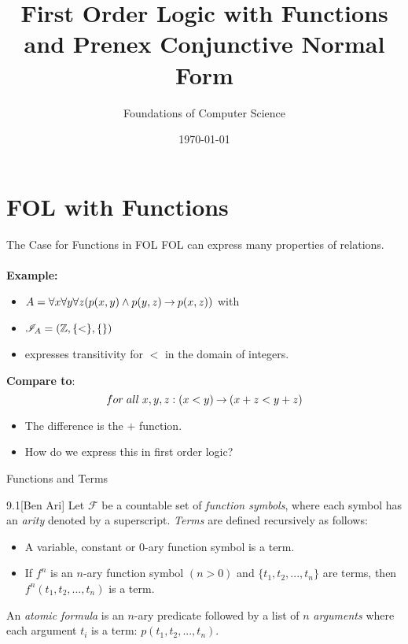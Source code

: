 \documentclass[style=sailor,size=12pt]{powerdot}
\title{First Order Logic with Functions and Prenex Conjunctive Normal Form}
\author{Foundations of Computer Science}
\date{\today}
\begin{document}
\maketitle
\section[slide=false]{FOL with Functions}
\begin{slide}[bm=,toc=]{The Case for Functions in FOL}
FOL can express many properties of relations. 
\\~\\
{\bf Example:}
\begin{itemize}
\item $A = \forall x \forall y \forall z (p(x,y) \land p (y,z) \mathbin{\rightarrow} p(x,z))$ with
\item $\mathcal{I}_A = (\mathbb{Z},\{<\},\{\})$
\item expresses transitivity for $<$ in the domain of integers.
\end{itemize}
\vspace{2ex}
{\bf Compare to}:
\[
  for\; all\;  x,y,z: (x < y) \mathbin{\rightarrow} (x + z < y + z)
  \]

\vspace{-1ex}
\begin{itemize}
\item The difference is the $+$ function.
\item How do we express this in first order logic?
\end{itemize}

\end{slide}

\begin{wideslide}[bm=,toc=]{Functions and Terms}
\begin{defn}{9.1}[Ben Ari]
Let $\mathcal{F}$ be a countable set of \emph{function symbols}, where
each symbol has an \emph{arity} denoted by a superscript. \emph{Terms} are
defined recursively as follows:
\end{defn}
\vspace{-2ex}
\begin{itemize}
\item A variable, constant or $0$-ary function symbol is a term.
\item If $f^n$ is an $n$-ary function symbol $(n > 0)$ and $\{t_1,t_2,...,t_n\}$
are terms, then $f^n(t_1,t_2,...,t_n)$ is a term.
\end{itemize}
An \emph{atomic formula} is an $n$-ary predicate followed by a list of $n$
\emph{arguments} where each argument $t_i$ is a term: $p(t_1,t_2,...,t_n)$.

\end{wideslide}
\end{document}

